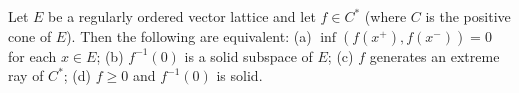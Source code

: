 Let $E$ be a regularly ordered vector lattice and let $f \in C^*$ (where $C$ is the positive cone of $E$). Then the following are equivalent:
(a) $\inf(f(x^+), f(x^-)) = 0$ for each $x \in E$;
(b) $f^{-1}(0)$ is a solid subspace of $E$;
(c) $f$ generates an extreme ray of $C^*$;
(d) $f \geq 0$ and $f^{-1}(0)$ is solid.
